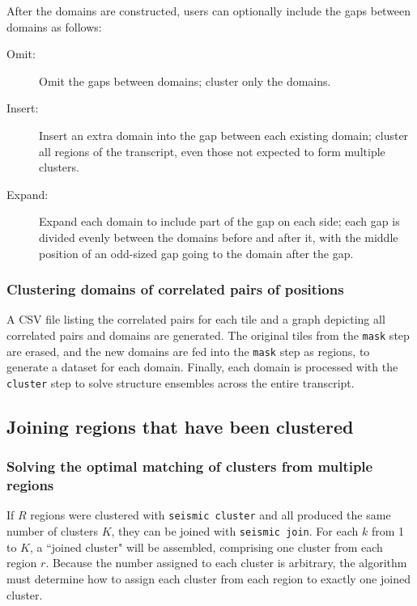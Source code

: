 \documentclass[11pt]{article}
\begin{document}
After the domains are constructed, users can optionally include the gaps between domains as follows:
\begin{description}
    \item[Omit:] Omit the gaps between domains; cluster only the domains.
    \item[Insert:] Insert an extra domain into the gap between each existing domain; cluster all regions of the transcript, even those not expected to form multiple clusters.
    \item[Expand:] Expand each domain to include part of the gap on each side; each gap is divided evenly between the domains before and after it, with the middle position of an odd-sized gap going to the domain after the gap. 
\end{description}

\subsubsection{Clustering domains of correlated pairs of positions}

A CSV file listing the correlated pairs for each tile and a graph depicting all correlated pairs and domains are generated.
The original tiles from the \verb|mask| step are erased, and the new domains are fed into the \verb|mask| step as regions, to generate a dataset for each domain.
Finally, each domain is processed with the \verb|cluster| step to solve structure ensembles across the entire transcript.


\subsection{Joining regions that have been clustered}

\subsubsection{Solving the optimal matching of clusters from multiple regions}

If $R$ regions were clustered with \verb|seismic cluster| and all produced the same number of clusters $K$, they can be joined with \verb|seismic join|.
For each $k$ from 1 to $K$, a ``joined cluster" will be assembled, comprising one cluster from each region $r$.
Because the number assigned to each cluster is arbitrary, the algorithm must determine how to assign each cluster from each region to exactly one joined cluster.
\end{document}

